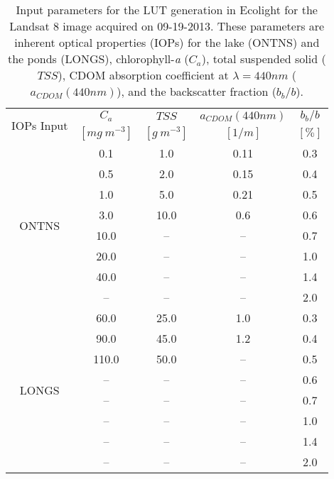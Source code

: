 \begin{table}[htb]
\caption{Input parameters for the LUT generation in Ecolight for the Landsat 8 image acquired on 09-19-2013. These parameters are inherent optical properties (IOPs) for the lake (ONTNS) and the ponds (LONGS), chlorophyll-{\it a} ($C_a$), total suspended solid ($TSS$), CDOM absorption coefficient at $\lambda=440nm$ ($a_{CDOM}(440nm)$), and the backscatter fraction ($b_b/b$). \label{tab:LUTconc}} 
\vspace{.07cm}
\small
\centering
    \begin{tabular}{ccccc}
    \hline \hline
    \multirow{2}{*}{IOPs Input} & \bfseries{$C_a$} & \bfseries{$TSS$} & \bfseries{$a_{CDOM}(440nm)$} & \bfseries{$b_b/b$}    \\
                   & $[mg~m^{-3}]$        & $[g~m^{-3}]$       &  $[1/m]$           & $[\%]$            \\ \hline \hline
\multirow{8}{*}{ONTNS}  &  0.1      & 1.0     &  0.11   &  0.3  \\
    &  0.5      & 2.0   &  0.15     &  0.4  \\
    &  1.0      & 5.0   &  0.21     &  0.5  \\
    &  3.0      & 10.0  &  0.6      &  0.6  \\ 
    &  10.0     & --    &  --     &  0.7  \\  
    &  20.0     & --    &  --     &  1.0  \\  
    &  40.0     & --    &  --     &  1.4  \\
    &  --       & --    &  --     &  2.0  \\ \hline

\multirow{8}{*}{LONGS}   &  60.0   & 25.0    &  1.0    &  0.3  \\
    &  90.0   & 45.0    &  1.2    &  0.4  \\
    &  110.0  & 50.0    &  --     &  0.5  \\
    &  --     & --      &  --     &  0.6  \\  
    &  --     & --      &  --     &  0.7  \\  
    &  --     & --      &  --     &  1.0  \\   
    &  --     & --      &  --     &  1.4  \\  
    &  --     & --      &  --     &  2.0  \\  \hline \hline
    \end{tabular}
  \end{table}

